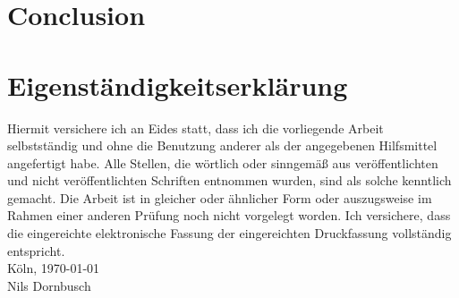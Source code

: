 \documentclass[12pt,a4paper,twoside, open=right]{scrreprt}
\theoremstyle{definition}
\theoremstyle{plain}
\begin{document}
\chapter{Conclusion}

\setcounter{lofdepth}{2}
\listoffigures
\newpage
{}

{}
\newpage
\chapter*{Eigenständigkeitserklärung}
Hiermit versichere ich an Eides statt, dass ich die vorliegende Arbeit selbstständig und ohne die Benutzung anderer als der angegebenen  Hilfsmittel  angefertigt  habe.  
Alle  Stellen,  die  wörtlich  oder  sinngemäß  aus  veröffentlichten  und  nicht  veröffentlichten  Schriften  entnommen  wurden,  sind  als  solche  kenntlich  gemacht.  
Die  Arbeit  ist  in  gleicher  oder  ähnlicher  Form  oder  auszugsweise  im  Rahmen  einer  anderen  Prüfung  noch  nicht  vorgelegt  worden. 
Ich  versichere,  dass  die  eingereichte    elektronische    Fassung    der    eingereichten    Druckfassung    vollständig    entspricht.
\\[\bigskipamount]
Köln, \today
\\[2\bigskipamount]
Nils Dornbusch
\end{document}
